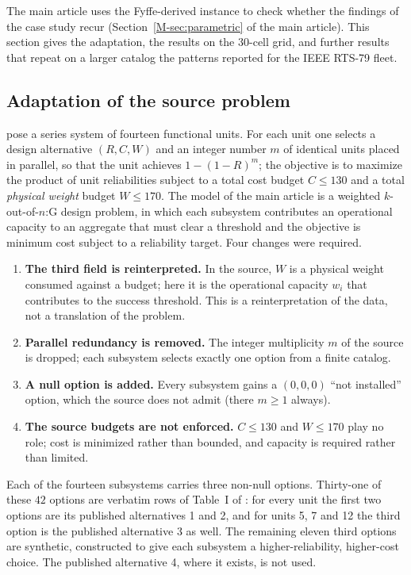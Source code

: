 \documentclass[11pt]{article}
\begin{document}
The main article uses the Fyffe-derived instance to check whether the findings of the case study recur (Section~\ref*{M-sec:parametric} of the main article). This section gives the adaptation, the results on the $30$-cell grid, and further results that repeat on a larger catalog the patterns reported for the IEEE RTS-79 fleet.

\subsection{Adaptation of the source problem} \label{sec:supp_fyffe_adaptation}

\citet{Fyffe1968} pose a series system of fourteen functional units. For each unit one selects a
design alternative $(R, C, W)$ and an integer number $m$ of identical units placed in parallel, so that
the unit achieves $1-(1-R)^{m}$; the objective is to maximize the product of unit reliabilities subject to
a total cost budget $C \le 130$ and a total \emph{physical weight} budget $W \le 170$. The model of the
main article is a weighted $k$-out-of-$n$:G design problem, in which each subsystem contributes an
operational capacity to an aggregate that must clear a threshold and the objective is minimum cost
subject to a reliability target. Four changes were required.
\begin{enumerate}
\item \textbf{The third field is reinterpreted.} In the source, $W$ is a physical weight consumed
against a budget; here it is the operational capacity $w_i$ that contributes to the success threshold.
This is a reinterpretation of the data, not a translation of the problem.
\item \textbf{Parallel redundancy is removed.} The integer multiplicity $m$ of the source is dropped;
each subsystem selects exactly one option from a finite catalog.
\item \textbf{A null option is added.} Every subsystem gains a $(0,0,0)$ ``not installed'' option,
which the source does not admit (there $m \ge 1$ always).
\item \textbf{The source budgets are not enforced.} $C \le 130$ and $W \le 170$ play no role; cost is
minimized rather than bounded, and capacity is required rather than limited.
\end{enumerate}

Each of the fourteen subsystems carries three non-null options. Thirty-one of these $42$ options are
verbatim rows of Table~I of \citet{Fyffe1968}: for every unit the first two options are its published
alternatives 1 and 2, and for units 5, 7 and 12 the third option is the published alternative 3 as
well. The remaining eleven third options are synthetic, constructed to give each subsystem a
higher-reliability, higher-cost choice. The published alternative 4, where it exists, is not used.
\end{document}

